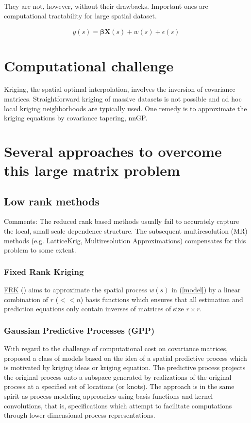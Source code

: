 \documentclass[
12pt, %
a4paper, %
oneside, %
headinclude,footinclude, %
BCOR5mm, %
]{scrartcl}
\begin{document}
They are not, however, without their drawbacks. Important ones are computational tractability for large spatial dataset.

\begin{equation}
\begin{aligned}
y(s) = \boldsymbol{\beta}\boldsymbol{X}(s) + w(s) + \epsilon(s)
\end{aligned} \label{model}
\end{equation}

\section{Computational challenge}
Kriging, the spatial optimal interpolation, involves the inversion of covariance matrices. Straightforward kriging of massive datasets is not possible and ad hoc local kriging neighborhoods are typically used. One remedy is to approximate the kriging equations by covariance tapering, nnGP.
\section{Several approaches to overcome this large matrix problem}

\subsection{Low rank methods}
\textcolor[rgb]{1.00,0.00,1.00}{Comments:}
The reduced rank based methods usually fail to accurately capture the local, small scale dependence structure. The subsequent multiresolution (MR) methods (e.g. LatticeKrig, Multiresolution Approximations) compensates for this problem to some extent.
\subsubsection{Fixed Rank Kriging}
\href{https://chenyw68.github.io/Literature/[2008]Fixed rank kriging for very large spatial data sets.pdf}{FRK} (\cite{cressie2008fixed}) aims to approximate the spatial process $w(s)$ in (\ref{model}) by a linear combination of $r$ ($<< n$) basis functions which ensures that all estimation and prediction equations only contain inverses of matrices of size $r \times r$.
\subsubsection{Gaussian Predictive Processes (GPP)}
With regard to the challenge of computational cost on covariance matrices, \href{https://chenyw68.github.io/Literature/[2016]Hierarchical nearest-neighbor Gaussian process models for large geostatistical datasets.pdf}{\cite{banerjee2008gaussian}} proposed a class of models based on the idea of a spatial predictive process which is motivated by kriging ideas or kriging equation. The predictive process projects the original process onto a subspace generated by realizations of the original process at a specified set of locations (or knots). The approach is in the same spirit as process modeling approaches using basis functions and kernel convolutions, that is, specifications which attempt to facilitate computations through lower dimensional process representations.
\end{document}
